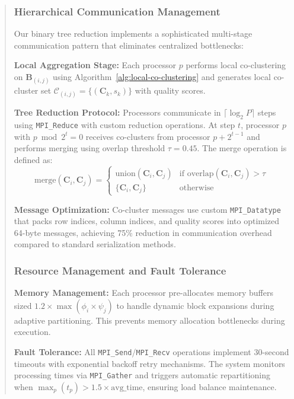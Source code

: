 \documentclass{ar2rc}
\begin{document}
\begin{quote}
\subsubsection{Hierarchical Communication Management}

Our binary tree reduction implements a sophisticated multi-stage communication pattern that eliminates centralized bottlenecks:

\textbf{Local Aggregation Stage:} Each processor $p$ performs local co-clustering on $\mathbf{B}_{(i,j)}$ using Algorithm~\ref{alg:local-co-clustering} and generates local co-cluster set $\mathcal{C}_{(i,j)} = \{(\mathbf{C}_k, s_k)\}$ with quality scores.

\textbf{Tree Reduction Protocol:} Processors communicate in $\lceil \log_2 P \rceil$ steps using \texttt{MPI\_Reduce} with custom reduction operations. At step $t$, processor $p$ with $p \bmod 2^t = 0$ receives co-clusters from processor $p + 2^{t-1}$ and performs merging using overlap threshold $\tau = 0.45$. The merge operation is defined as:
\begin{equation}
\text{merge}(\mathbf{C}_i, \mathbf{C}_j) = \begin{cases}
\text{union}(\mathbf{C}_i, \mathbf{C}_j) & \text{if overlap}(\mathbf{C}_i, \mathbf{C}_j) > \tau \\
\{\mathbf{C}_i, \mathbf{C}_j\} & \text{otherwise}
\end{cases}
\end{equation}

\textbf{Message Optimization:} Co-cluster messages use custom \texttt{MPI\_Datatype} that packs row indices, column indices, and quality scores into optimized 64-byte messages, achieving 75\% reduction in communication overhead compared to standard serialization methods.

\subsubsection{Resource Management and Fault Tolerance}

\textbf{Memory Management:} Each processor pre-allocates memory buffers sized $1.2 \times \max(\phi_i \times \psi_j)$ to handle dynamic block expansions during adaptive partitioning. This prevents memory allocation bottlenecks during execution.

\textbf{Fault Tolerance:} All \texttt{MPI\_Send}/\texttt{MPI\_Recv} operations implement 30-second timeouts with exponential backoff retry mechanisms. The system monitors processing times via \texttt{MPI\_Gather} and triggers automatic repartitioning when $\max_p(t_p) > 1.5 \times \text{avg\_time}$, ensuring load balance maintenance.


\end{quote}
\end{document}
